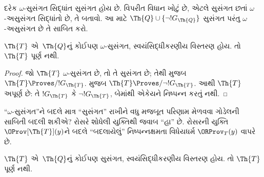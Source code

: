\begin{prob}
  દરેક $\omega$-સુસંગત
  સિદ્ધાંત સુસંગત હોય છે.
  વિપરીત વિધાન ખોટું છે,
  એટલે સુસંગત છતાં
  $\omega$-અસુસંગત
  સિદ્ધાંતો છે, તે બતાવો.
  આ માટે $\Th{Q} \cup
  \{\lnot !G_\Th{Q}\}$
  સુસંગત પરંતુ
  $\omega$-અસુસંગત છે
  તે સાબિત કરો.
\end{prob}

\begin{thm}
$\Th{T}$ એ~$\Th{Q}$નું
કોઈપણ $\omega$-સુસંગત,
સ્વયંસિદ્ધીકરણીય વિસ્તરણ
હોય. તો $\Th{T}$ પૂર્ણ
નથી.
\end{thm}

\begin{proof}
  જો $\Th{T}$
  $\omega$-સુસંગત છે,
  તો તે સુસંગત છે; તેથી
  મુજબ $\Th{T}
  \Proves/ !G_\Th{T}$.
  મુજબ
  $\Th{T} \Proves/ \lnot !G_\Th{T}$.
  આથી $\Th{T}$ અપૂર્ણ
  છે: તે $!G_\Th{T}$
  કે $\lnot !G_\Th{T}$,
  બેમાંથી એકેયને
  નિષ્પન્ન કરતું નથી.
\end{proof}
\endgroup


\begingroup
\makeatletter{}\makeatother


\label{guunit:OLP-0316}


``$\omega$-સુસંગત''ને
બદલે માત્ર ``સુસંગત''
રાખીને વધુ મજબૂત
પરિણામ મેળવવા ગોડેલની
સાબિતી બદલી શકીએ?
રોસરે શોધેલી યુક્તિથી
જવાબ ``હા'' છે.
રોસરની યુક્તિ
$\OProv[\Th{T}](y)$ને
બદલે ``બદલાયેલું''
નિષ્પન્નક્ષમતા વિધેયધર્મ
$\ORProv_T(y)$ વાપરે છે.

\begin{thm}
$\Th{T}$ એ~$\Th{Q}$નું
કોઈપણ સુસંગત,
સ્વયંસિદ્ધીકરણીય વિસ્તરણ
હોય. તો $\Th{T}$
પૂર્ણ નથી.
\end{thm}

